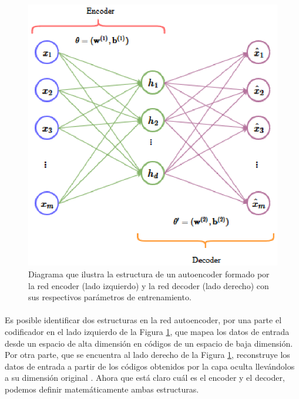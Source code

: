 \documentclass[12pt]{article}%
\begin{document}
\begin{figure}[ht]
  \centering
    \includegraphics{./AE.eps}
  \caption{Diagrama que ilustra la estructura de un autoencoder formado por la red encoder (lado izquierdo) y la red decoder (lado derecho) con sus respectivos parámetros de entrenamiento.}
  \label{fig:ae}
\end{figure}

\paragraph{}
Es posible identificar dos estructuras en la red autoencoder, por una parte el codificador en el lado izquierdo de la Figura \ref{fig:ae}, que mapea los datos de entrada desde un espacio de alta dimensión en códigos de un espacio de baja dimensión. Por otra parte, que se encuentra al lado derecho de la Figura \ref{fig:ae}, reconstruye los datos de entrada a partir de los códigos obtenidos por la capa oculta llevándolos a su dimensión original \cite{shao}. Ahora que está claro cuál es el encoder y el decoder, podemos definir matemáticamente ambas estructuras.
\end{document}
